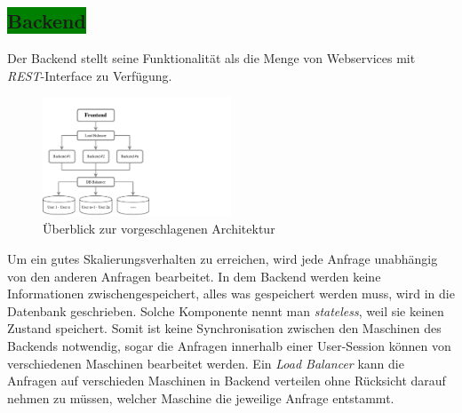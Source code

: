 
\subsection{\colorbox{green}{Backend}}

Der Backend stellt seine Funktionalität als die Menge von Webservices mit \textit{REST}-Interface zu Verfügung.

\begin{figure}[H]
\centering
\includegraphics[trim = 0mm 0mm 0mm 0mm, clip, width=0.5\textwidth]{resources/ueberblickArchitektur}
\caption[Überblick zur vorgeschlagenen Architektur]{Überblick zur vorgeschlagenen Architektur}
\label{img:ueberblickArchitektur}
\end{figure}

Um ein gutes Skalierungsverhalten zu erreichen, wird jede Anfrage unabhängig von den anderen Anfragen bearbeitet. In dem Backend werden keine Informationen zwischengespeichert, alles was gespeichert werden muss, wird in die Datenbank geschrieben. Solche Komponente nennt man \textit{stateless}, weil sie keinen Zustand speichert. Somit ist keine Synchronisation zwischen den Maschinen des Backends notwendig, sogar die Anfragen innerhalb einer User-Session können von verschiedenen Maschinen bearbeitet werden. Ein \textit{Load Balancer} kann die Anfragen auf verschieden Maschinen in Backend verteilen ohne Rücksicht darauf nehmen zu müssen, welcher Maschine die jeweilige Anfrage entstammt.

